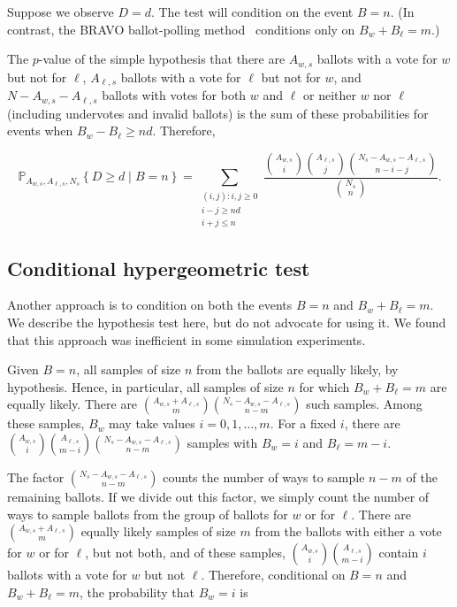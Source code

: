 Suppose we observe $D=d$.
The test will condition on the event $B=n$. 
(In contrast, the BRAVO ballot-polling
method~\citep{lindemanEtal12}
conditions only on $B_w+B_\ell = m$.)

The $p$-value of the simple hypothesis that there are $A_{w,s}$ ballots with
a vote for $w$ but not for $\ell$, $A_{\ell,s}$ ballots with a vote for $\ell$ but not for $w$, 
and $N - A_{w,s} - A_{\ell,s}$ ballots with votes for both $w$ and $\ell$ or neither $w$ nor $\ell$ 
(including undervotes and
invalid ballots) is the sum of these probabilities for events when $B_w - B_\ell \geq nd$.
Therefore,

\begin{equation}
   \mathbb{P}_{A_{w,s}, A_{\ell,s}, N_s} \left \{ D \geq d \;\vert\; B = n\right \} = 
   \sum_{\substack{(i, j) :  i, j\ge 0 \\ i-j \geq nd \\ i+j \leq n}} \frac{ {A_{w,s } \choose i}{A_{\ell,s} \choose j}{N_s - A_{w,s} - A_{\ell,s} \choose n-i-j}}{{N_s \choose n}}.
\end{equation}


\subsection{Conditional hypergeometric test}
Another approach is to condition on both the events $B=n$ and $B_w+B_\ell=m$.
We describe the hypothesis test here, but do not advocate for using it.
We found that this approach was inefficient in some simulation experiments.

Given $B=n$, all samples of size $n$ from the ballots are equally likely, by hypothesis.
Hence, in particular, all samples of size $n$ for which $B_w + B_\ell = m$ are equally likely.
There are ${A_{w,s}+A_{\ell,s} \choose m}{N_s - A_{w,s}-A_{\ell,s} \choose n-m}$ such samples.
Among these samples, $B_w$ may take values $i=0, 1, \dots, m$.
For a fixed $i$, there are ${A_{w,s} \choose i}{A_{\ell, s} \choose m-i}{N_s - A_{w,s} - A_{\ell,s} \choose n-m}$
samples with $B_w=i$ and $B_\ell = m-i$.

The factor ${N_s - A_{w,s} - A_{\ell,s} \choose n-m}$ counts the number of ways to sample $n-m$ of the
remaining ballots.
If we divide out this factor, we simply count the number of ways to sample ballots
from the group of ballots for $w$ or for $\ell$.
There are ${A_{w,s}+A_{\ell,s} \choose m}$ equally likely samples of size $m$ from
the ballots with either a vote for $w$ or for $\ell$, but not both, 
and of these samples, ${A_{w,s} \choose i}{A_{\ell, s} \choose m-i}$ contain $i$ ballots with a vote for $w$ but not $\ell$.
Therefore, conditional on $B=n$ and $B_w+B_\ell=m$, the probability that $B_w=i$ is

